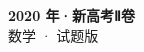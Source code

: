\documentclass[zihao=-4, a4paper]{ctexart}
\begin{document}
\begin{center}
  {\Large\bfseries 2020 年·新高考Ⅱ卷}\\[4pt]
  {\large 数学 · 试题版}
\end{center}
\medskip
{}

\end{document}
